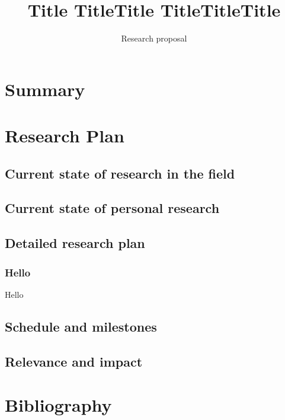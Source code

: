 \documentclass[a4paper,11pt]{article}
\title{Title TitleTitle TitleTitleTitle}
\subtitle{Research proposal}
\begin{document}
\maketitlebox

\section{Summary}

\section{Research Plan}
\subsection{Current state of research in the field}
\subsection{Current state of personal research}
\subsection{Detailed research plan}
\subsubsection{Hello}
Hello

\subsection{Schedule and milestones}
\subsection{Relevance and impact}

\section{Bibliography}

\begingroup
	\renewcommand{\section}[2]{}%
	
	
\endgroup
\end{document}
